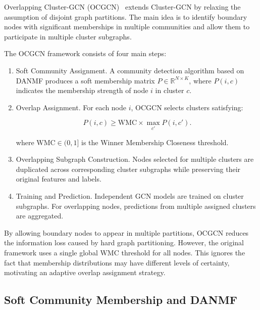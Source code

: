 \documentclass[pdflatex,sn-mathphys-num]{sn-jnl}%
\theoremstyle{thmstyleone}%
\theoremstyle{thmstyletwo}%
\theoremstyle{thmstylethree}%
\begin{document}
Overlapping Cluster-GCN (OCGCN)~\citep{Amintoosi2021} extends Cluster-GCN by relaxing the assumption of disjoint graph partitions.
The main idea is to identify boundary nodes with significant memberships in multiple communities and allow them to participate in multiple cluster subgraphs.

The OCGCN framework consists of four main steps:

\begin{enumerate}

\item {Soft Community Assignment.}
A community detection algorithm based on DANMF produces a soft membership matrix
$P\in\mathbb{R}^{N\times K}$,
where $P(i,c)$ indicates the membership strength of node $i$ in cluster $c$.

\item {Overlap Assignment.}
For each node $i$, OCGCN selects clusters satisfying:

\begin{equation}
P(i,c)\geq \mathrm{WMC}\times\max_{c'}P(i,c').
\label{eq:wmc}
\end{equation}

where $\mathrm{WMC}\in(0,1]$ is the Winner Membership Closeness threshold.

\item {Overlapping Subgraph Construction.}
Nodes selected for multiple clusters are duplicated across corresponding cluster subgraphs while preserving their original features and labels.

\item {Training and Prediction.}
Independent GCN models are trained on cluster subgraphs.
For overlapping nodes, predictions from multiple assigned clusters are aggregated.

\end{enumerate}

By allowing boundary nodes to appear in multiple partitions, OCGCN reduces the information loss caused by hard graph partitioning.
However, the original framework uses a single global WMC threshold for all nodes.
This ignores the fact that membership distributions may have different levels of certainty, motivating an adaptive overlap assignment strategy.

\subsection{Soft Community Membership and DANMF}
\label{subsec:danmf}
\end{document}
